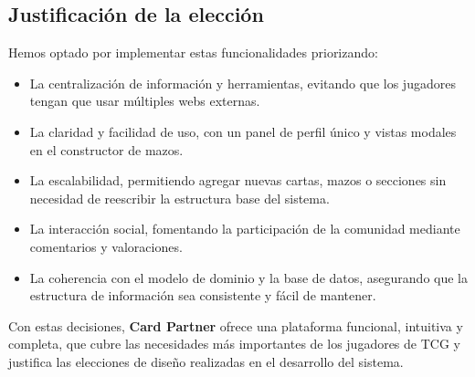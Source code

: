 \documentclass[10pt]{article}
\begin{document}
		\subsection{Justificación de la elección}
			Hemos optado por implementar estas funcionalidades priorizando:

			\begin{itemize}
				\item La centralización de información y herramientas, evitando que los jugadores tengan que usar múltiples webs externas.
				\item La claridad y facilidad de uso, con un panel de perfil único y vistas modales en el constructor de mazos.
				\item La escalabilidad, permitiendo agregar nuevas cartas, mazos o secciones sin necesidad de reescribir la estructura base del sistema.
				\item La interacción social, fomentando la participación de la comunidad mediante comentarios y valoraciones.
				\item La coherencia con el modelo de dominio y la base de datos, asegurando que la estructura de información sea consistente y fácil de mantener.
			\end{itemize}

			Con estas decisiones, \textbf{Card Partner} ofrece una plataforma funcional, intuitiva y completa, que cubre las necesidades más importantes de los jugadores de TCG y justifica las elecciones de diseño realizadas en el desarrollo del sistema.
				
\end{document}

